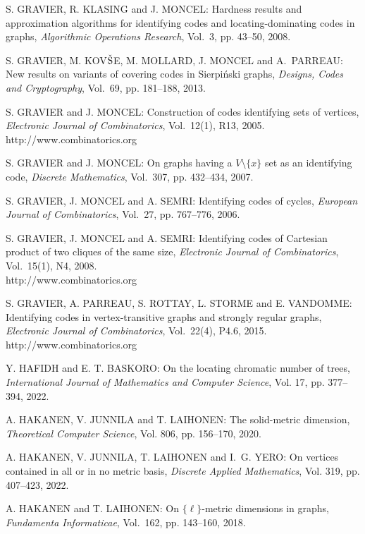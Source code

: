 \begin{thebibliography}{999}
S. GRAVIER, R. KLASING and J. MONCEL: Hardness results and approximation algorithms for identifying codes and locating-dominating codes in graphs, {\it Algorithmic Operations Research}, Vol.~3, pp. 43--50, 2008.

S. GRAVIER, M. KOV$\check{\rm S}$E, M. MOLLARD, J. MONCEL and A.~PARREAU: New results on variants of covering codes in Sierpi\'nski graphs, {\it Designs, Codes and Cryptography}, Vol.~69, pp. 181--188, 2013.

S. GRAVIER and J. MONCEL: Construction of codes identifying sets of vertices, {\it Electronic Journal of Combinatorics}, Vol.~12(1), R13, 2005.\\
http://www.combinatorics.org

S. GRAVIER and J. MONCEL: On graphs having a $V \setminus \{ x \}$ set as an identifying code, {\it Discrete Mathematics}, Vol.~307, pp. 432--434, 2007.

S. GRAVIER, J. MONCEL and A. SEMRI: Identifying codes of cycles, {\it European Journal of Combinatorics}, Vol.~27, pp. 767--776, 2006.

S. GRAVIER, J. MONCEL and A. SEMRI: Identifying codes of Cartesian product of two cliques of the same size, {\it Electronic Journal of Combinatorics}, Vol.~15(1), N4, 2008.\\
http://www.combinatorics.org

S. GRAVIER, A. PARREAU, S. ROTTAY, L. STORME and E. VANDOMME: Identifying codes in vertex-transitive graphs and strongly regular graphs, {\it Electronic Journal of Combinatorics}, Vol.~22(4), P4.6, 2015.\\
http://www.combinatorics.org

Y. HAFIDH and E. T. BASKORO: On the locating chromatic number of trees, {\it  International Journal of Mathematics and Computer Science}, Vol. 17, pp. 377--394, 2022.

A. HAKANEN, V. JUNNILA and T. LAIHONEN: The solid-metric dimension, {\it Theoretical Computer Science}, Vol. 806, pp. 156--170, 2020.

A. HAKANEN, V. JUNNILA, T. LAIHONEN and I.~G. YERO: On vertices contained in all or in no metric basis, {\it Discrete Applied Mathematics}, Vol. 319, pp. 407--423, 2022.

A. HAKANEN and T. LAIHONEN: On $\{\ell\}$-metric dimensions in graphs, {\it Fundamenta Informaticae}, Vol.~162, pp. 143--160, 2018. 


\end{thebibliography}
